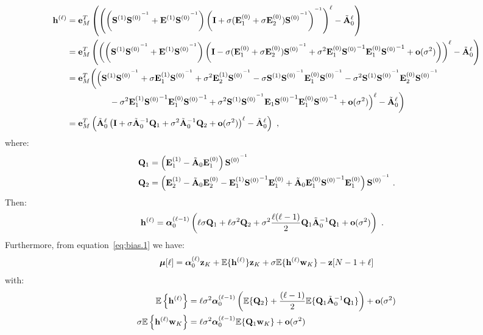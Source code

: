 \begin{align*}
{\mathbf h}^{(\ell)} &= {\mathbf e}_M^T\left( \left( \left({\mathbf S}^{(1)}{{\mathbf S}^{(0)}}^{^{-1}}+{\mathbf E}^{(1)}{{\mathbf S}^{(0)}}^{^{-1}}\right)\left({\mathbf I}+\sigma({\mathbf E}_1^{(0)}+\sigma{\mathbf E}_2^{(0)}){{\mathbf S}^{(0)}}^{^{-1}}\right)^{^{-1}} \right)^\ell- \tilde{{\mathbf A}}_0^\ell\right) \\
& = {\mathbf e}_M^T\left( \left( \left({\mathbf S}^{(1)}{{\mathbf S}^{(0)}}^{^{-1}}+{\mathbf E}^{(1)}{{\mathbf S}^{(0)}}^{^{-1}}\right)\left({\mathbf I}-\sigma({\mathbf E}_1^{(0)}+\sigma{\mathbf E}_2^{(0)}){{\mathbf S}^{(0)}}^{^{-1}} + \sigma^2{\mathbf E}_1^{(0)}{{\mathbf S}^{(0)}}^{-1}{\mathbf E}_1^{(0)}{{\mathbf S}^{(0)}}^{-1} +{\mathbf o}(\sigma^2)\right)\right)^\ell- \tilde{{\mathbf A}}_0^\ell\right) \\
& = {\mathbf e}_M^T\bigg( \Big( {\mathbf S}^{(1)}{{\mathbf S}^{(0)}}^{^{-1}}+\sigma{\mathbf E}^{(1)}_1{{\mathbf S}^{(0)}}^{^{-1}}+\sigma^2{\mathbf E}^{(1)}_2{{\mathbf S}^{(0)}}^{^{-1}} - \sigma {\mathbf S}^{(1)}{{\mathbf S}^{(0)}}^{^{-1}}{\mathbf E}_1^{(0)}{{\mathbf S}^{(0)}}^{^{-1}} - \sigma^2{\mathbf S}^{(1)}{{\mathbf S}^{(0)}}^{^{-1}}{\mathbf E}_2^{(0)}{{\mathbf S}^{(0)}}^{^{-1}}\\
& \hspace{50pt}-\sigma^2{\mathbf E}^{(1)}_1{{\mathbf S}^{(0)}}^{-1}{\mathbf E}_1^{(0)}{{\mathbf S}^{(0)}}^{-1} + \sigma^2{\mathbf S}^{(1)}{{\mathbf S}^{(0)}}^{^{-1}}{\mathbf E}_1{{\mathbf S}^{(0)}}^{-1}{\mathbf E}_1^{(0)}{{\mathbf S}^{(0)}}^{-1} +{\mathbf o}(\sigma^2)\Big)^\ell- \tilde{{\mathbf A}}_0^\ell\bigg) \\
&= {\mathbf e}_M^T\left( \tilde{{\mathbf A}}_0^\ell\left( {\mathbf I}+\sigma\tilde{{\mathbf A}}_0^{-1}{\mathbf Q}_1+\sigma^2\tilde{{\mathbf A}}_0^{-1}{\mathbf Q}_2 +{\mathbf o}(\sigma^2)\right)^\ell- \tilde{{\mathbf A}}_0^\ell\right)\ ,\\
\end{align*}
where:
\begin{align*}
{\mathbf Q}_1 &= \left( {\mathbf E}^{(1)}_1- \tilde{{\mathbf A}}_0{\mathbf E}_1^{(0)} \right){{\mathbf S}^{(0)}}^{^{-1}}\\
{\mathbf Q}_2 &= \left( {\mathbf E}^{(1)}_2 - \tilde{{\mathbf A}}_0{\mathbf E}_2^{(0)} - {\mathbf E}^{(1)}_1{{\mathbf S}^{(0)}}^{-1}{\mathbf E}_1^{(0)} + \tilde{{\mathbf A}}_0{\mathbf E}_1^{(0)}{{\mathbf S}^{(0)}}^{-1}{\mathbf E}_1^{(0)}\right){{\mathbf S}^{(0)}}^{^{-1}} \ .
\end{align*}
Then:
\begin{align*}
{\mathbf h}^{(\ell)} &= \boldsymbol{\alpha}_0^{(\ell-1)}\left(\ell\sigma{\mathbf Q}_1 + \ell\sigma^2{\mathbf Q}_2 + \sigma^2\dfrac{\ell(\ell-1)}{2}{\mathbf Q}_1\tilde{{\mathbf A}}_0^{-1}{\mathbf Q}_1 + {\mathbf o}(\sigma^2)\right)\ .
\end{align*}
Furthermore, from equation~\eqref{eq:bias.1} we have:
\begin{equation*}
\boldsymbol{\mu}[\ell] = \boldsymbol{\alpha}_0^{(\ell)}{\mathbf z}_{K} + {\mathbb E}\{{\mathbf h}^{(\ell)}\}{\mathbf z}_{K} + \sigma{\mathbb E}\{{\mathbf h}^{(\ell)}{\mathbf w}_{K}\} - {\mathbf z}[N-1+\ell]
\end{equation*}
with:
\begin{align*}
{\mathbb E}\left\{{\mathbf h}^{(\ell)}\right\} &= \ell\sigma^2\boldsymbol{\alpha}_0^{(\ell-1)}\left({\mathbb E}\{{\mathbf Q}_2\} + \dfrac{(\ell-1)}{2}{\mathbb E}\{{\mathbf Q}_1\tilde{{\mathbf A}}_0^{-1}{\mathbf Q}_1\}\right)  + {\mathbf o}(\sigma^2)\\
\sigma{\mathbb E}\left\{{\mathbf h}^{(\ell)}{\mathbf w}_K\right\} &= \ell\sigma^2\boldsymbol{\alpha}_0^{(\ell-1)}{\mathbb E}\{{\mathbf Q}_1{\mathbf w}_K\} + {\mathbf o}(\sigma^2)
\end{align*}
